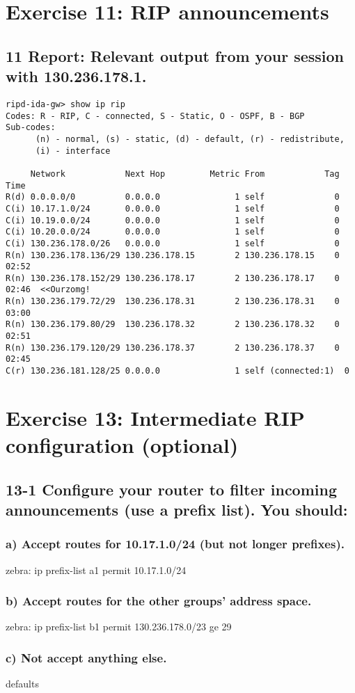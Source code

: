\section{Exercise 11: RIP announcements}
\subsection{11 Report: Relevant output from your session with 130.236.178.1.}
\begin{verbatim}
ripd-ida-gw> show ip rip
Codes: R - RIP, C - connected, S - Static, O - OSPF, B - BGP
Sub-codes:
      (n) - normal, (s) - static, (d) - default, (r) - redistribute,
      (i) - interface

     Network            Next Hop         Metric From            Tag Time
R(d) 0.0.0.0/0          0.0.0.0               1 self              0
C(i) 10.17.1.0/24       0.0.0.0               1 self              0
C(i) 10.19.0.0/24       0.0.0.0               1 self              0
C(i) 10.20.0.0/24       0.0.0.0               1 self              0
C(i) 130.236.178.0/26   0.0.0.0               1 self              0
R(n) 130.236.178.136/29 130.236.178.15        2 130.236.178.15    0 02:52
R(n) 130.236.178.152/29 130.236.178.17        2 130.236.178.17    0 02:46  <<Ourzomg!
R(n) 130.236.179.72/29  130.236.178.31        2 130.236.178.31    0 03:00
R(n) 130.236.179.80/29  130.236.178.32        2 130.236.178.32    0 02:51
R(n) 130.236.179.120/29 130.236.178.37        2 130.236.178.37    0 02:45
C(r) 130.236.181.128/25 0.0.0.0               1 self (connected:1)  0
\end{verbatim}

\section{Exercise 13: Intermediate RIP configuration (optional)}
\subsection{13-1 Configure your router to filter incoming announcements (use a prefix list). You should:}
\subsubsection{a) Accept routes for 10.17.1.0/24 (but not longer prefixes).}
zebra: ip prefix-list a1 permit 10.17.1.0/24

\subsubsection{b) Accept routes for the other groups' address space.}
zebra: ip prefix-list b1 permit 130.236.178.0/23 ge 29

\subsubsection{c) Not accept anything else.}
defaults


